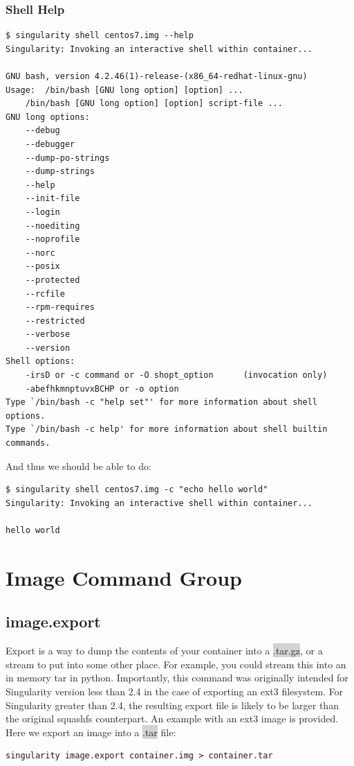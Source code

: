 \documentclass[a4paper]{article}
\begin{document}
\subsubsection{Shell Help}
\begin{lstlisting}[frame=single]
$ singularity shell centos7.img --help
Singularity: Invoking an interactive shell within container...

GNU bash, version 4.2.46(1)-release-(x86_64-redhat-linux-gnu)
Usage:	/bin/bash [GNU long option] [option] ...
	/bin/bash [GNU long option] [option] script-file ...
GNU long options:
	--debug
	--debugger
	--dump-po-strings
	--dump-strings
	--help
	--init-file
	--login
	--noediting
	--noprofile
	--norc
	--posix
	--protected
	--rcfile
	--rpm-requires
	--restricted
	--verbose
	--version
Shell options:
	-irsD or -c command or -O shopt_option		(invocation only)
	-abefhkmnptuvxBCHP or -o option
Type `/bin/bash -c "help set"' for more information about shell options.
Type `/bin/bash -c help' for more information about shell builtin commands.
\end{lstlisting}
	And thus we should be able to do:\\[0.1in]
\begin{lstlisting}[frame=single]
$ singularity shell centos7.img -c "echo hello world"
Singularity: Invoking an interactive shell within container...

hello world
\end{lstlisting}
\section{Image Command Group}

\subsection{image.export}
\label{sec:imageexport}

Export is a way to dump the contents of your container into a \colorbox{lightgray}{.tar.gz}, or a stream to put into some other place. For example, you could stream this into an in memory tar in python. Importantly, this command was originally intended for Singularity version less than 2.4 in the case of exporting an ext3 filesystem. For Singularity greater than 2.4, the resulting export file is likely to be larger than the original squashfs counterpart. An example with an ext3 image is provided.\\[0.1in]

Here we export an image into a \colorbox{lightgray}{.tar} file:
\begin{lstlisting}[frame=single]
singularity image.export container.img > container.tar
\end{lstlisting}
\end{document}
